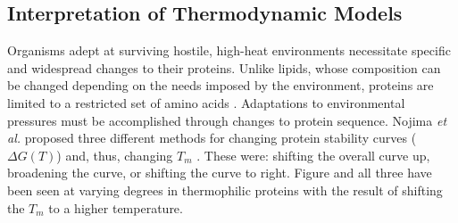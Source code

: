 {%




\subsection{Interpretation of Thermodynamic Models}

Organisms adept at surviving hostile, high-heat environments necessitate
specific and widespread changes to their proteins.  Unlike lipids, whose
composition can be changed depending on the needs imposed by the environment,
proteins are limited to a restricted set of amino acids
\cite{Razvi_ref_Russell_1990}.  Adaptations to environmental pressures must be
accomplished through changes to protein sequence. Nojima \emph{et al.} proposed
three different methods for changing protein stability curves ($\Delta G \left
(  T \right )$) and, thus, changing ${T}_{m}$ \cite{Razvi_Nojima_1977}.  These
were: shifting the overall curve up, broadening the curve, or shifting the
curve to right.  Figure %
and all three have been seen at varying degrees in thermophilic proteins
with the result of shifting the ${T }_{m }$ to a higher temperature.  

}

